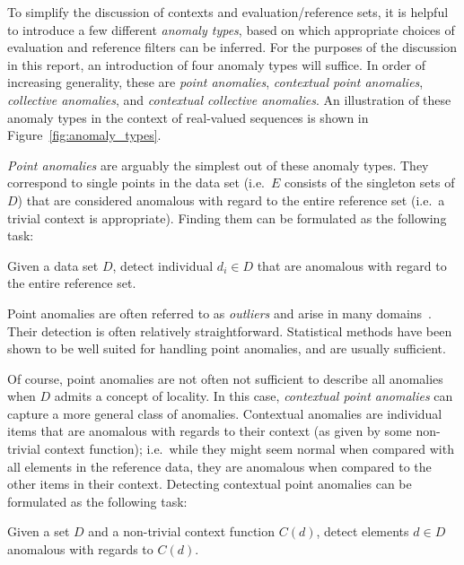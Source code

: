To simplify the discussion of contexts and evaluation/reference sets, it is helpful to introduce a few different \emph{anomaly types}, based on which appropriate choices of evaluation and reference filters can be inferred. For the purposes of the discussion in this report, an introduction of four anomaly types will suffice. In order of increasing generality, these are \emph{point anomalies}, \emph{contextual point anomalies}, \emph{collective anomalies}, and \emph{contextual collective anomalies}. An illustration of these anomaly types in the context of real-valued sequences is shown in Figure~\ref{fig:anomaly_types}.

\emph{Point anomalies} are arguably the simplest out of these anomaly types. They correspond to single points in the data set (i.e.\ $E$ consists of the singleton sets of $D$) that are considered anomalous with regard to the entire reference set (i.e.\ a trivial context is appropriate). Finding them can be formulated as the following task:

\begin{task}
\label{task:point}
  Given a data set $D$, detect individual $d_i \in D$ that are anomalous with regard to the entire reference set.
\end{task}

Point anomalies are often referred to as \emph{outliers} and arise in many domains~\cite{eskin}. Their detection is often relatively straightforward. Statistical methods have been shown to be well suited for handling point anomalies, and are usually sufficient.

Of course, point anomalies are not often not sufficient to describe all anomalies when $D$ admits a concept of locality. In this case, \emph{contextual point anomalies} can capture a more general class of anomalies. Contextual anomalies are individual items that are anomalous with regards to their context (as given by some non-trivial context function); i.e.\ while they might seem normal when compared with all elements in the reference data, they are anomalous when compared to the other items in their context. Detecting contextual point anomalies can be formulated as the following task:

\begin{task}
\label{task:contextual}
  Given a set $D$ and a non-trivial context function $C(d)$, detect elements $d \in D$ anomalous with regards to $C(d)$.
\end{task}

